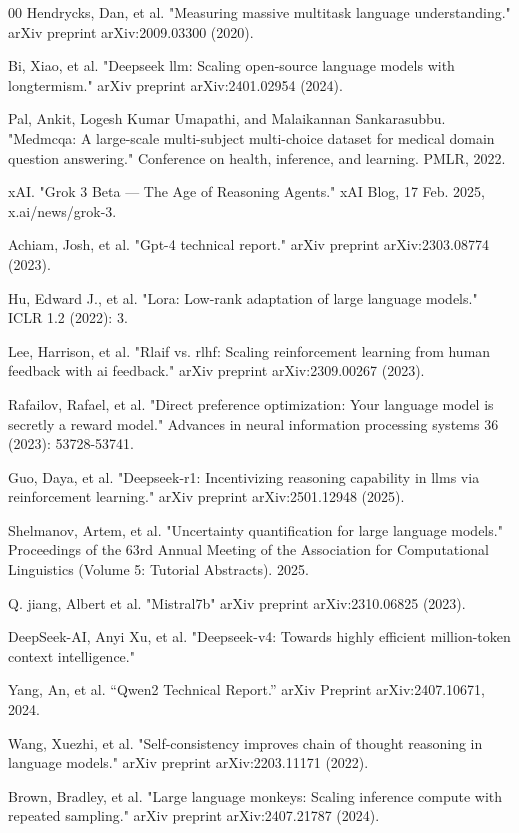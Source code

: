\documentclass[review]{elsarticle}
\begin{document}
\begin{thebibliography}{00}
Hendrycks, Dan, et al. "Measuring massive multitask language understanding." arXiv preprint arXiv:2009.03300 (2020).

Bi, Xiao, et al. "Deepseek llm: Scaling open-source language models with longtermism." arXiv preprint arXiv:2401.02954 (2024).

Pal, Ankit, Logesh Kumar Umapathi, and Malaikannan Sankarasubbu. "Medmcqa: A large-scale multi-subject multi-choice dataset for medical domain question answering." Conference on health, inference, and learning. PMLR, 2022.

xAI. "Grok 3 Beta --- The Age of Reasoning Agents." xAI Blog, 17 Feb. 2025, x.ai/news/grok-3.

Achiam, Josh, et al. "Gpt-4 technical report." arXiv preprint arXiv:2303.08774 (2023).

Hu, Edward J., et al. "Lora: Low-rank adaptation of large language models." ICLR 1.2 (2022): 3.

Lee, Harrison, et al. "Rlaif vs. rlhf: Scaling reinforcement learning from human feedback with ai feedback." arXiv preprint arXiv:2309.00267 (2023).

Rafailov, Rafael, et al. "Direct preference optimization: Your language model is secretly a reward model." Advances in neural information processing systems 36 (2023): 53728-53741.

Guo, Daya, et al. "Deepseek-r1: Incentivizing reasoning capability in llms via reinforcement learning." arXiv preprint arXiv:2501.12948 (2025).

Shelmanov, Artem, et al. "Uncertainty quantification for large language models." Proceedings of the 63rd Annual Meeting of the Association for Computational Linguistics (Volume 5: Tutorial Abstracts). 2025.

Q. jiang, Albert et al. "Mistral7b" arXiv preprint arXiv:2310.06825 (2023).

DeepSeek-AI, Anyi Xu, et al. "Deepseek-v4: Towards highly efficient million-token context intelligence."

Yang, An, et al. “Qwen2 Technical Report.” arXiv Preprint arXiv:2407.10671, 2024.

Wang, Xuezhi, et al. "Self-consistency improves chain of thought reasoning in language models." arXiv preprint arXiv:2203.11171 (2022).

Brown, Bradley, et al. "Large language monkeys: Scaling inference compute with repeated sampling." arXiv preprint arXiv:2407.21787 (2024).

\end{thebibliography}
\end{document}
